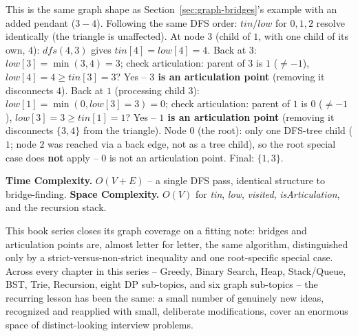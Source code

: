 
This is the same graph shape as Section~\ref{sec:graph-bridges}'s
example with an added pendant ($3{-}4$). Following the same DFS order:
$\textit{tin}/\textit{low}$ for $0,1,2$ resolve identically (the
triangle is unaffected). At node $3$ (child of $1$, with one child of
its own, $4$): $\textit{dfs}(4,3)$ gives
$\textit{tin}[4]=\textit{low}[4]=4$. Back at $3$:
$\textit{low}[3]=\min(3,4)=3$; check articulation: parent of $3$ is
$1$ ($\neq-1$), $\textit{low}[4]{=}4 \ge \textit{tin}[3]{=}3$? Yes --
\textbf{$3$ is an articulation point} (removing it disconnects $4$).
Back at $1$ (processing child $3$): $\textit{low}[1]=\min(0,
\textit{low}[3]{=}3)=0$; check articulation: parent of $1$ is $0$
($\neq-1$), $\textit{low}[3]{=}3 \ge \textit{tin}[1]{=}1$? Yes --
\textbf{$1$ is an articulation point} (removing it disconnects $\{3,4\}$
from the triangle). Node $0$ (the root): only one DFS-tree child
($1$; node $2$ was reached via a back edge, not as a tree child), so
the root special case does \textbf{not} apply -- $0$ is not an
articulation point. Final: $\{1,3\}$.

\begin{complexitybox}
\textbf{Time Complexity.} $O(V+E)$ -- a single DFS pass, identical
structure to bridge-finding.
\textbf{Space Complexity.} $O(V)$ for \textit{tin}, \textit{low},
\textit{visited}, \textit{isArticulation}, and the recursion stack.
\end{complexitybox}

\begin{takeawaybox}
This book series closes its graph coverage on a fitting note: bridges
and articulation points are, almost letter for letter, the same
algorithm, distinguished only by a strict-versus-non-strict inequality
and one root-specific special case. Across every chapter in this
series -- Greedy, Binary Search, Heap, Stack/Queue, BST, Trie,
Recursion, eight DP sub-topics, and six graph sub-topics -- the
recurring lesson has been the same: a small number of genuinely new
ideas, recognized and reapplied with small, deliberate
modifications, cover an enormous space of distinct-looking interview
problems.
\end{takeawaybox}
